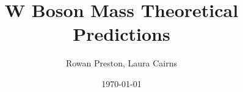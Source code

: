 \documentclass[a4paper]{article}
\title{W Boson Mass Theoretical Predictions}
\author{Rowan Preston, Laura Cairns}
\date{\today}
\begin{document}
\maketitle

\BsToJPsiPhi \cite{TestCitation}

{}

\end{document}
